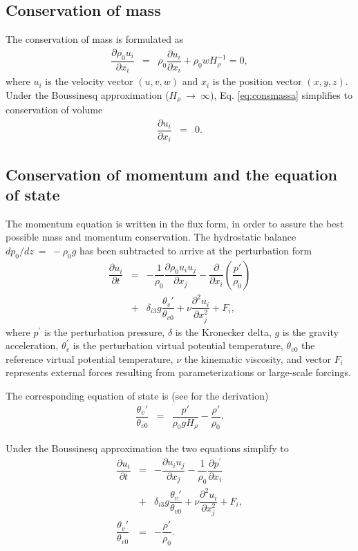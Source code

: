 \documentclass[gmd]{copernicus}
\begin{document}
\subsection{Conservation of mass}
The conservation of mass is formulated as
\begin{eqnarray}
\dfrac{\partial \rho_0 u_i}{\partial x_i} & = & \rho_0 \dfrac{\partial u_i}{\partial x_i} + \rho_0 w H_{\rho}^{-1} = 0, \label{eq:consmassa}
\end{eqnarray}
where $u_i$ is the velocity vector $(u,v,w)$ and $x_i$ is the position vector $(x,y,z)$.
Under the Boussinesq approximation ($H_{\rho}~\rightarrow~\infty$), Eq. \ref{eq:consmassa} simplifies to conservation of volume
\begin{eqnarray}
\dfrac{\partial u_i}{\partial x_i} & = & 0. \label{eq:consmassb}
\end{eqnarray}

\subsection{Conservation of momentum and the equation of state}
The momentum equation is written in the flux form, in order to assure the best possible mass and momentum conservation. The hydrostatic balance $dp_0 / dz~=~-\rho_0 g$ has been subtracted to arrive at the perturbation form
\begin{eqnarray}
\nonumber \dfrac{\partial u_i}{\partial t} & = & - \dfrac{1}{\rho_0} \dfrac{\partial \rho_0 u_i u_j}{\partial x_j} 
- \dfrac{\partial}{\partial x_i}\left(\dfrac{p'}{\rho_0}\right) \\
& + & \delta_{i3} g \dfrac{\theta_v'}{\theta_{v0}} + \nu \dfrac{\partial^2 u_i}{\partial x_j^2} + F_i,\label{eq:consmoma}
\end{eqnarray}
where $p^\prime$ is the perturbation pressure, $\delta$ is the Kronecker delta, $g$ is the gravity acceleration, $\theta_v^\prime$ is the perturbation virtual potential temperature,  $\theta_{v0}$ the reference virtual potential temperature, $\nu$ the kinematic viscosity, and vector $F_i$ represents external forces resulting from parameterizations or large-scale forcings.

The corresponding equation of state is (see \citet{Bannon1996} for the derivation)
\begin{eqnarray}
\dfrac{\theta_v'}{\theta_{v0}} & = & \dfrac{p'}{\rho_0 g H_{\rho}} - \dfrac{\rho'}{\rho_0}.\label{eq:statea}
\end{eqnarray}

Under the Boussinesq approximation the two equations simplify to
\begin{eqnarray}
\nonumber \dfrac{\partial u_i}{\partial t} & = & - \dfrac{\partial u_i u_j}{\partial x_j} - \dfrac{1}{\rho_0}\dfrac{\partial p^\prime}{\partial x_i} \\
& + & \delta_{i3} g \dfrac{\theta_v'}{\theta_{v0}} + \nu \dfrac{\partial^2 u_i}{\partial x_j^2} + F_i \label{eq:consmomb},\\
\dfrac{\theta_v'}{\theta_{v0}} & = & - \dfrac{\rho'}{\rho_0}\label{eq:stateb}.
\end{eqnarray}
\end{document}
